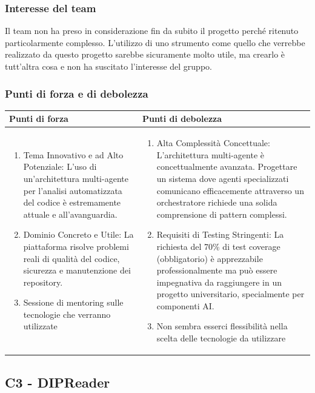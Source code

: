 \documentclass[a4paper,11pt]{article}
\begin{document}
\subsubsection{Interesse del team}
Il team non ha preso in considerazione fin da subito il progetto perché ritenuto particolarmente complesso. L'utilizzo di uno strumento come quello che verrebbe realizzato da questo progetto sarebbe sicuramente molto utile, ma crearlo è tutt'altra cosa e non ha suscitato l'interesse del gruppo.
\subsubsection{Punti di forza e di debolezza}
{\footnotesize
\begin{tabularx}{\textwidth}{|X|X|}
\hline
\rowcolor{lightgray!40} %
\textbf{Punti di forza} & \textbf{Punti di debolezza} \\
\hline
\begin{enumerate}
\item Tema Innovativo e ad Alto Potenziale: L'uso di un'architettura multi-agente per l'analisi automatizzata del codice è estremamente attuale e all'avanguardia.
\item Dominio Concreto e Utile: La piattaforma risolve problemi reali di qualità del codice, sicurezza e manutenzione dei repository. 
\item Sessione di mentoring sulle tecnologie che verranno utilizzate
\end{enumerate}
 & \begin{enumerate}
\item Alta Complessità Concettuale: L'architettura multi-agente è concettualmente avanzata. Progettare un sistema dove agenti specializzati comunicano efficacemente attraverso un orchestratore richiede una solida comprensione di pattern complessi.
\item  Requisiti di Testing Stringenti: La richiesta del 70\% di test coverage (obbligatorio) è apprezzabile professionalmente ma può essere impegnativa da raggiungere in un progetto universitario, specialmente per componenti AI.
\item Non sembra esserci flessibilità nella scelta delle tecnologie da utilizzare
\end{enumerate} \\
\hline
\end{tabularx}
}

\newpage
\subsection{C3 - DIPReader}
\end{document}
